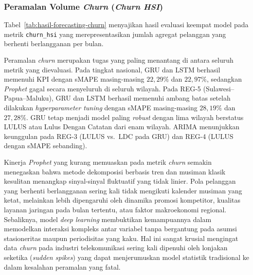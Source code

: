\subsubsection{Peramalan Volume \textit{Churn} (\textit{Churn HSI})}

Tabel~\ref{tab:hasil-forecasting-churn} menyajikan hasil evaluasi keempat model pada metrik \texttt{churn\_}\allowbreak\texttt{hsi} yang merepresentasikan jumlah agregat pelanggan yang berhenti berlangganan per bulan.



Peramalan \textit{churn} merupakan tugas yang paling menantang di antara seluruh metrik yang dievaluasi. Pada tingkat nasional, GRU dan LSTM berhasil memenuhi KPI dengan sMAPE masing-masing $22{,}29\%$ dan $22{,}97\%$, sedangkan \textit{Prophet} gagal secara menyeluruh di seluruh wilayah. Pada REG-5 (Sulawesi--Papua--Maluku), GRU dan LSTM berhasil memenuhi ambang batas setelah dilakukan \textit{hyperparameter tuning} dengan sMAPE masing-masing $28{,}19\%$ dan $27{,}28\%$. GRU tetap menjadi model paling \textit{robust} dengan lima wilayah berstatus LULUS atau Lulus Dengan Catatan dari enam wilayah. ARIMA menunjukkan keunggulan pada REG-3 (LULUS vs.\ LDC pada GRU) dan REG-4 (LULUS dengan sMAPE sebanding).

Kinerja \textit{Prophet} yang kurang memuaskan pada metrik \textit{churn} semakin menegaskan bahwa metode dekomposisi berbasis tren dan musiman klasik kesulitan menangkap sinyal-sinyal fluktuatif yang tidak linier. Pola pelanggan yang berhenti berlangganan sering kali tidak mengikuti kalender musiman yang ketat, melainkan lebih dipengaruhi oleh dinamika promosi kompetitor, kualitas layanan jaringan pada bulan tertentu, atau faktor makroekonomi regional. Sebaliknya, model \textit{deep learning} membuktikan kemampuannya dalam memodelkan interaksi kompleks antar variabel tanpa bergantung pada asumsi stasioneritas maupun periodisitas yang kaku. Hal ini sangat krusial mengingat data \textit{churn} pada industri telekomunikasi sering kali dipenuhi oleh lonjakan seketika (\textit{sudden spikes}) yang dapat menjerumuskan model statistik tradisional ke dalam kesalahan peramalan yang fatal.


